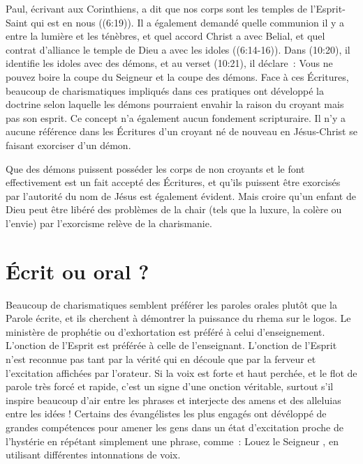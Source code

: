 \begin{specialpar}{}
Paul, écrivant aux Corinthiens, a dit que nos corps sont les temples
 de l'Esprit-Saint qui est en nous ((6:19)).
 Il a également demandé quelle communion il y a entre la lumière
 et les ténèbres, et quel accord Christ a avec Belial,
 et quel contrat d'alliance le temple de Dieu a avec les idoles
 ((6:14-16)). Dans (10:20),
 il identifie les idoles avec des démons, et au verset (10:21),
 il déclare~: \og Vous ne pouvez boire la coupe du Seigneur
 et la coupe des démons. \fg{} Face à ces Écritures,
 beaucoup de charismatiques impliqués dans ces pratiques
 ont développé la doctrine selon laquelle les démons pourraient envahir
 la raison du croyant mais pas son esprit.
 Ce concept n'a également aucun fondement scripturaire.
 Il n'y a aucune référence dans les Écritures d'un croyant né de nouveau
 en Jésus-Christ se faisant exorciser d'un \linebreak démon.
\end{specialpar}

Que des démons puissent posséder les corps de non croyants
 et le font effectivement est un fait accepté des Écritures,
 et qu'ils puissent être exorcisés par l'autorité du nom de Jésus
 est également évident. Mais croire qu'un enfant de Dieu peut être libéré
 des problèmes de la chair (tels que la luxure, la colère ou l'envie)
 par l'exorcisme relève de la charismanie.


\section*{Écrit ou oral ?}

Beaucoup de charismatiques semblent préférer les paroles orales
 plutôt que la Parole écrite, et ils cherchent à démontrer la puissance
 du rhema sur le logos. Le ministère de prophétie ou d'exhortation
 est préféré à celui d'enseignement. L'onction de l'Esprit est préférée
 à celle de l'enseignant. L'onction de l'Esprit n'est reconnue
 pas tant par la vérité qui en découle que par la ferveur
 et l'excitation affichées par l'orateur. Si la voix est forte
 et haut perchée, et le flot de parole très forcé et rapide,
 c'est un signe d'une onction véritable, surtout s'il inspire beaucoup
 d'air entre les phrases et interjecte des amens et des alleluias
 entre les idées ! Certains des évangélistes les plus engagés
 ont dévéloppé de grandes compétences pour amener les gens
 dans un état d'excitation proche de l'hystérie en répétant simplement
 une phrase, comme~: \og Louez le Seigneur \fg{}, en utilisant différentes
 intonnations de voix.

